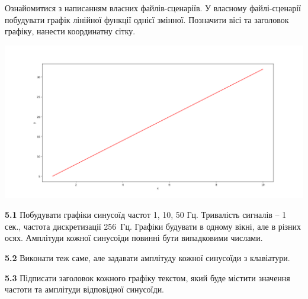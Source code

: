 \documentclass[a4paper,12pt]{article}
\begin{document}
\begin{center}
\textbf{}\par
\end{center}
Ознайомитися з написанням власних файлів-сценаріїв. У власному файлі-сценарії побудувати графік лінійної функції однієї змінної. Позначити вісі та заголовок графіку, нанести координатну сітку.\par

\begin{center}
\includegraphics[height = 12 cm,width=14 cm]{lin.png}
\end{center}
\vspace{1cm}\par



\begin{center}
\textbf{}\par
\end{center}
\textbf{5.1} Побудувати графіки синусоїд частот 1, 10, 50 Гц. Тривалість сигналів – 1 сек., частота дискретизації 256 Гц. Графіки будувати в одному вікні, але в різних осях. Амплітуди кожної синусоїди повинні бути випадковими числами.\par
\textbf{5.2} Виконати теж саме, але  задавати амплітуду кожної синусоїди з клавіатури.\par
\textbf{5.3} Підписати заголовок кожного графіку текстом, який буде містити значення частоти та амплітуди відповідної синусоїди.\par

\end{document}
